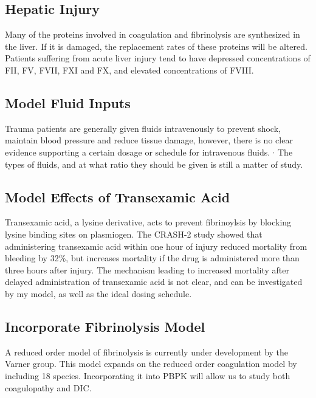 \documentclass[12pt]{article}
\begin{document}
\subsection*{Hepatic Injury}
Many of the proteins involved in coagulation and fibrinolysis are synthesized in the liver. If it is damaged, the replacement rates of these proteins will be altered. Patients suffering from acute liver injury tend to have depressed concentrations of FII, FV, FVII, FXI and FX, and elevated concentrations of FVIII. \cite{kerr2003effects} 
\subsection*{Model Fluid Inputs}
Trauma patients are generally given fluids intravenously to prevent shock, maintain blood pressure and reduce tissue damage, however, there is no clear evidence supporting a certain dosage or schedule for intravenous fluids. \cite{kwan2014timing} $^,$ \cite{roberts2001normalisation} The types of fluids, and at what ratio they should be given is still a matter of study. \cite{spahn2007management} 
\subsection*{Model Effects of Transexamic Acid}
Transexamic acid, a lysine derivative, acts to prevent fibrinoylsis by blocking lysine binding sites on plasmiogen.\cite{dunn1999tranexamic} The CRASH-2 study showed that administering transexamic acid within one hour of injury reduced mortality from bleeding by 32\%, but increases mortality if the drug is administered more than three hours after injury.\cite{crash2011importance} The mechanism leading to increased mortality after delayed administration of transexamic acid is not clear, and can be investigated by my model, as well as the ideal dosing schedule. 
\subsection*{Incorporate Fibrinolysis Model}
A reduced order model of fibrinolysis is currently under development by the Varner group. This model expands on the reduced order coagulation model by including 18 species. Incorporating it into PBPK will allow us to study both coagulopathy and DIC. 
\end{document}
